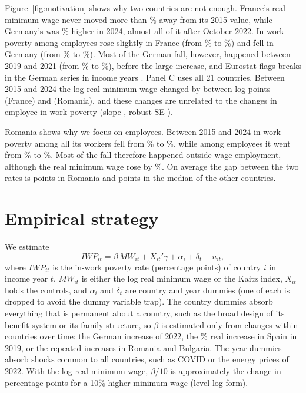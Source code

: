 \documentclass[10pt,a4paper]{article}
\begin{document}
Figure~\ref{fig:motivation} shows why two countries are not enough. France's real minimum wage never moved more than \FrMwMaxDev\% away from its 2015 value, while Germany's was \DeMwGrowth\% higher in 2024, almost all of it after October 2022. In-work poverty among employees rose slightly in France (from \FrIwpStart\% to \FrIwpEnd\%) and fell in Germany (from \DeIwpStart\% to \DeIwpEnd\%). Most of the German fall, however, happened between 2019 and 2021 (from \DeIwpNineteen\% to \DeIwpTwentyOne\%), before the large increase, and Eurostat flags breaks in the German series in income years \DeBreakYears. Panel C uses all 21 countries. Between 2015 and 2024 the log real minimum wage changed by between \LdMwMin{} log points (France) and \LdMwMax{} (Romania), and these changes are unrelated to the changes in employee in-work poverty (slope \LdSlope, robust SE \LdSe).

Romania shows why we focus on employees. Between 2015 and 2024 in-work poverty among all its workers fell from \RoIwpStart\% to \RoIwpEnd\%, while among employees it went from \RoSalStart\% to \RoSalEnd\%. Most of the fall therefore happened outside wage employment, although the real minimum wage rose by \RoMwGrowth\%. On average the gap between the two rates is \RoGap{} points in Romania and \OtherGap{} points in the median of the other countries.

\section{Empirical strategy}

We estimate
\begin{equation}
\mathit{IWP}_{it} = \beta\, \mathit{MW}_{it} + X_{it}'\gamma + \alpha_i + \delta_t + u_{it},
\label{eq:main}
\end{equation}
where $\mathit{IWP}_{it}$ is the in-work poverty rate (percentage points) of country $i$ in income year $t$, $\mathit{MW}_{it}$ is either the log real minimum wage or the Kaitz index, $X_{it}$ holds the controls, and $\alpha_i$ and $\delta_t$ are country and year dummies (one of each is dropped to avoid the dummy variable trap). The country dummies absorb everything that is permanent about a country, such as the broad design of its benefit system or its family structure, so $\beta$ is estimated only from changes within countries over time: the German increase of 2022, the \EsMwJump\% real increase in Spain in 2019, or the repeated increases in Romania and Bulgaria. The year dummies absorb shocks common to all countries, such as COVID or the energy prices of 2022. With the log real minimum wage, $\beta/10$ is approximately the change in percentage points for a 10\% higher minimum wage (level-log form).
\end{document}

